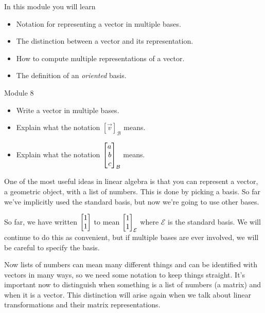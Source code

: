 \documentclass{workbook}
\begin{document}
\begin{module}

	In this module you will learn
	\begin{itemize}
		\item Notation for representing a vector in multiple bases.
		\item The distinction between a vector and its representation.
		\item How to compute multiple representations of a vector.
		\item The definition of an \emph{oriented} basis.
	\end{itemize}

	
	
\end{module}
\begin{lesson}

	Module 8

	\begin{itemize}
		\item Write a vector in multiple bases.
		\item Explain what the notation $[\vec v]_{\mathcal B}$ means.
		\item Explain what the notation $\mat{a\\b\\c}_{\mathcal B}$ means.
	\end{itemize}

	One of the most useful ideas in linear algebra is that you can
	represent a vector, a geometric object, with a list of numbers. This
	is done by picking a basis. So far we've implicitly used the standard basis,
	but now we're going to use other bases.

	\begin{annotation}
		\begin{notes}
			So far, we have written $\mat{1\\1}$ to mean
			$\mat{1\\1}_{\mathcal E}$ where $\mathcal E$ is the
			standard basis. We will continue to do this as convenient,
			but if multiple bases are ever involved, we will be careful
			to specify the basis.
		\end{notes}
	\end{annotation}
	Now lists of numbers can mean many different things and can be identified
	with vectors in many ways, so we need some notation to keep things straight.
	It's important now to distinguish when something is a list of numbers (a matrix)
	and when it is a vector. This distinction will arise again when
	we talk about linear transformations and their matrix representations.

\end{lesson}
\end{document}
